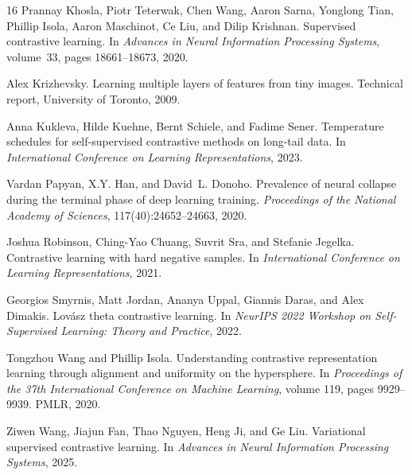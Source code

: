 \documentclass{article}
\begin{document}
\begin{thebibliography}{16}
Prannay Khosla, Piotr Teterwak, Chen Wang, Aaron Sarna, Yonglong Tian, Phillip Isola, Aaron Maschinot, Ce Liu, and Dilip Krishnan.
\newblock Supervised contrastive learning.
\newblock In \emph{Advances in Neural Information Processing Systems}, volume~33, pages 18661--18673, 2020.

Alex Krizhevsky.
\newblock Learning multiple layers of features from tiny images.
\newblock Technical report, University of Toronto, 2009.

Anna Kukleva, Hilde Kuehne, Bernt Schiele, and Fadime Sener.
\newblock Temperature schedules for self-supervised contrastive methods on long-tail data.
\newblock In \emph{International Conference on Learning Representations}, 2023.

Vardan Papyan, X.Y. Han, and David~L. Donoho.
\newblock Prevalence of neural collapse during the terminal phase of deep learning training.
\newblock \emph{Proceedings of the National Academy of Sciences}, 117(40):24652--24663, 2020.

Joshua Robinson, Ching-Yao Chuang, Suvrit Sra, and Stefanie Jegelka.
\newblock Contrastive learning with hard negative samples.
\newblock In \emph{International Conference on Learning Representations}, 2021.

Georgios Smyrnis, Matt Jordan, Ananya Uppal, Giannis Daras, and Alex Dimakis.
\newblock Lov{\'a}sz theta contrastive learning.
\newblock In \emph{NeurIPS 2022 Workshop on Self-Supervised Learning: Theory and Practice}, 2022.

Tongzhou Wang and Phillip Isola.
\newblock Understanding contrastive representation learning through alignment and uniformity on the hypersphere.
\newblock In \emph{Proceedings of the 37th International Conference on Machine Learning}, volume 119, pages 9929--9939. PMLR, 2020.

Ziwen Wang, Jiajun Fan, Thao Nguyen, Heng Ji, and Ge Liu.
\newblock Variational supervised contrastive learning.
\newblock In \emph{Advances in Neural Information Processing Systems}, 2025.


\end{thebibliography}
\end{document}
